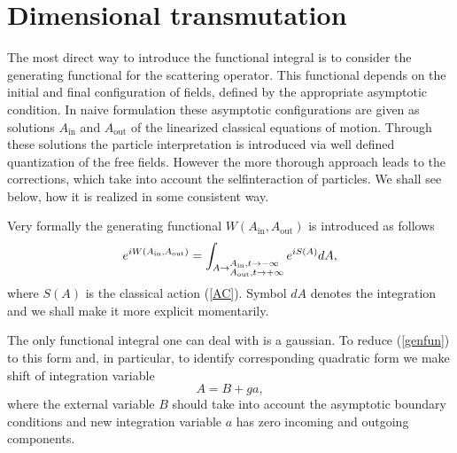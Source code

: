 \documentclass[12pt]{article}
\begin{document}
\section{Dimensional transmutation}
	The most direct way to introduce the functional integral
	is to consider the generating functional for the scattering
	operator.
	This functional depends on the initial and final configuration
	of fields, defined by the appropriate asymptotic condition.
	In naive formulation these asymptotic configurations are
	given as solutions
    $ A_{\text{in}} $ and
    $ A_{\text{out}} $
	of the linearized classical equations of motion.
	Through these solutions the particle interpretation is introduced
	via well defined quantization of the free fields.
	However the more thorough approach leads to the corrections,
	which take into account the selfinteraction of particles.
	We shall see below, how it is realized in some consistent
	way.

	Very formally the generating functional
    $ W(A_{\text{in}},A_{\text{out}}) $
	is introduced as follows
\begin{equation}
\label{genfun}
    e^{i W(A_{\text{in}}, A_{\text{out}})} = \int_{A \to 
	    \begin{subarray}{l} 
		A_{\text{in}}, t \to - \infty \\
		A_{\text{out}}, t \to + \infty
	    \end{subarray}}
    e^{i S(A)} d A ,
\end{equation}
	where
    $ S(A) $
	is the classical action
(\ref{AC}).
	Symbol
    $ d A $
	denotes the integration and we shall make it more 
	explicit momentarily.

	The only functional integral one can deal with is a gaussian.
	To reduce
(\ref{genfun})
	to this form and, in particular, to identify corresponding quadratic
	form we make shift of integration variable
\begin{equation*}
    A = B + g a ,
\end{equation*}
	where the external variable
    $ B $ 
	should take into account the asymptotic boundary conditions 
	and new integration variable 
    $ a $
	has zero incoming and outgoing components.
\end{document}
